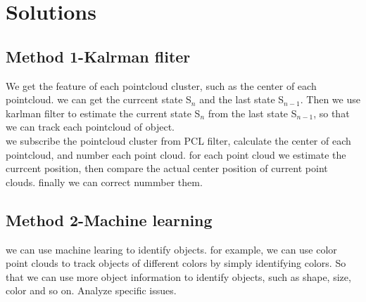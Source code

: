 \section{Solutions}
\subsection{Method 1-Kalrman fliter}
We get the feature of each pointcloud cluster, such as the center of each pointcloud.  we can get the currcent state S$_n$ and the last state S$_{n-1}$. Then we use karlman filter to estimate the current state S$_n$ from the last state S$_{n-1}$, so that we can track each pointcloud of object.\\
we subscribe the pointcloud cluster from PCL filter, calculate the center of each pointcloud, and number each point cloud. for each point cloud we estimate the currcent position, then compare the actual center position of current point clouds. finally we can correct nummber them.\\
\subsection{Method 2-Machine learning }
we can use machine learing to identify objects. for example, we can use color point clouds to track objects of different colors by simply identifying colors. So that we can use more object information to identify objects, such as shape, size, color and so on. Analyze specific issues.\\